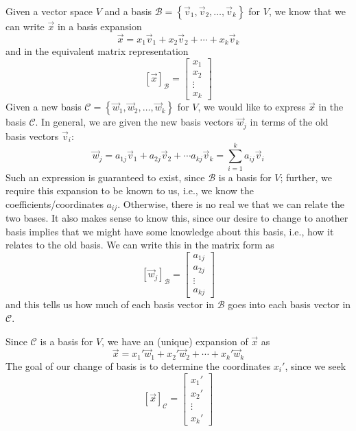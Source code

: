 Given a vector space $V$ and a basis $\mathcal{B} = \left\{ \vec{v}_1, \vec{v}_2, \ldots, \vec{v}_k \right\}$ for $V$, we know that we can write $\vec{x}$ in a basis expansion \[ \vec{x} = x_1 \vec{v}_1 + x_2 \vec{v}_2 + \cdots + x_k \vec{v}_k \] and in the equivalent matrix representation \[ \left[ \vec{x}\right]_{\mathcal{B}} = \left[ \begin{array}{c} x_1 \\ x_2 \\ \vdots \\ x_k \end{array}\right] \] Given a new basis $\mathcal{C} = \left\{ \vec{w}_1, \vec{w}_2, \ldots, \vec{w}_k \right\}$ for $V$, we would like to express $\vec{x}$ in the basis $\mathcal{C}$. In general, we are given the new basis vectors $\vec{w}_j$ in terms of the old basis vectors $\vec{v}_i$: \[ \vec{w}_j = a_{1j} \vec{v}_1 + a_{2j} \vec{v}_2 + \cdots a_{kj} \vec{v}_k = \sum_{i=1}^k a_{ij} \vec{v}_i \] Such an expression is guaranteed to exist, since $\mathcal{B}$ is a basis for $V$; further, we require this expansion to be known to us, i.e., we know the coefficients/coordinates $a_{ij}$. Otherwise, there is no real we that we can relate the two bases. It also makes sense to know this, since our desire to change to another basis implies that we might have some knowledge about this basis, i.e., how it relates to the old basis. We can write this in the matrix form as 
\begin{equation}
\label{eq:new_basis}
\left[ \vec{w}_j \right]_{\mathcal{B}} = \left[ \begin{array}{c} a_{1j} \\ a_{2j} \\ \vdots \\ a_{kj} \end{array}\right]
\end{equation} and this tells us how much of each basis vector in $\mathcal{B}$ goes into each basis vector in $\mathcal{C}$.

Since $\mathcal{C}$ is a basis for $V$, we have an (unique) expansion of $\vec{x}$ as \begin{equation}
\label{eq:new_expn}
\vec{x} = x_1 ' \vec{w}_1 + x_2 ' \vec{w}_2 + \cdots + x_k' \vec{w}_k
\end{equation}
The goal of our change of basis is to determine the coordinates $x_i'$, since we seek 
\begin{equation} \left[ \vec{x} \right]_{\mathcal{C}} = \left[ \begin{array}{c} x_1' \\ x_2' \\ \vdots \\ x_k' \end{array} \right] 
\end{equation}


